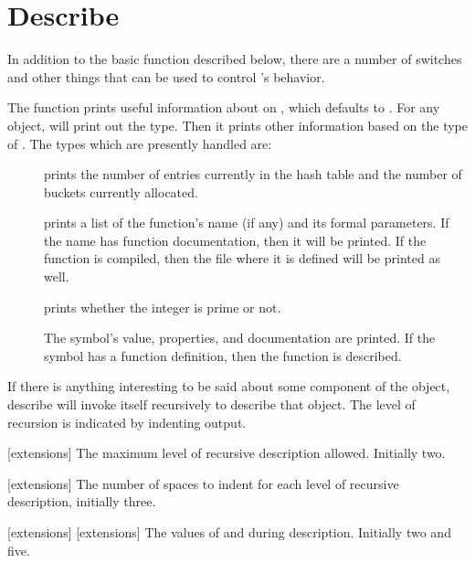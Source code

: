 \section{Describe}

In addition to the basic function described below, there are a number of
switches and other things that can be used to control 's
behavior.

The  function prints useful information about 
on , which defaults to .  For any
object,  will print out the type.  Then it prints other
information based on the type of .  The types which are
presently handled are:

\begin{description}

\item[]
 prints the number of entries currently
in the hash table and the number of buckets currently allocated.

\item[]
 prints a list of the function's name (if any) and
its formal parameters.  If the name has function documentation, then it will be
printed.  If the function is compiled, then the file where it is defined will
be printed as well.

\item[]
 prints whether the integer is prime or not.

\item[]
The symbol's value, properties, and documentation are printed.  If
the symbol has a function definition, then the function is described.
\end{description}
If there is anything interesting to be said about some component of
the object, describe will invoke itself recursively to describe that
object.  The level of recursion is indicated by indenting output.
\enddefun

[extensions]
The maximum level of recursive description allowed.  Initially two.
\enddefvar

[extensions]
The number of spaces to indent for each level of recursive
description, initially three.
\enddefvar

[extensions]
[extensions]
The values of  and  during
description.  Initially two and five.
\enddefvar

